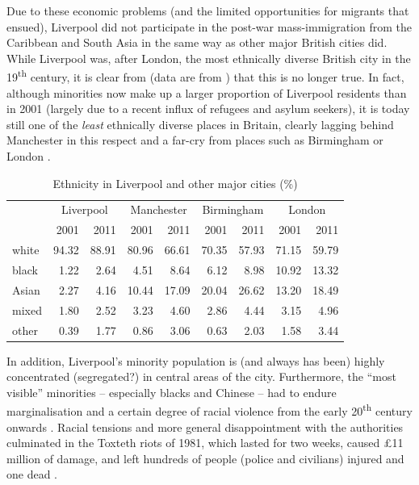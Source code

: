 Due to these economic problems (and the limited opportunities for migrants that ensued), Liverpool did not participate in the post-war mass-immigration from the Caribbean and South Asia in the same way as other major British cities did.
While Liverpool was, after London, the most ethnically diverse British city in the 19\textsuperscript{th} century, it is clear from  (data are from \citealt{nomis}) that this is no longer true.
In fact, although minorities now make up a larger proportion of Liverpool residents than in 2001 (largely due to a recent influx of refugees and asylum seekers), it is today still one of the \emph{least} ethnically diverse places in Britain, clearly lagging behind Manchester in this respect and a far-cry from places such as Birmingham or London \citep[cf.][187]{pooley2006}.

	\begin{table}[h]
		\centering
		\caption{Ethnicity in Liverpool and other major cities (\%)}
		\begin{tabular}{lrrrrrrrr}
			\toprule
	 		& \multicolumn{2}{c}{Liverpool} & \multicolumn{2}{c}{Manchester} & \multicolumn{2}{c}{Birmingham} & \multicolumn{2}{c}{London} \\
			 & 2001 & 2011 & 2001 & 2011 & 2001 & 2011 & 2001 & 2011 \\
			 \midrule
			 white & 94.32 & 88.91 & 80.96 & 66.61 & 70.35 & 57.93 & 71.15 & 59.79 \\
			 black & 1.22 & 2.64 & 4.51 & 8.64 & 6.12 & 8.98 & 10.92 & 13.32 \\
	 		 Asian & 2.27 & 4.16 & 10.44 & 17.09 & 20.04 & 26.62 & 13.20 & 18.49 \\
	 		 mixed & 1.80 & 2.52 & 3.23 & 4.60 & 2.86 & 4.44 & 3.15 & 4.96 \\
	 		 other & 0.39 & 1.77 & 0.86 & 3.06 & 0.63 & 2.03 & 1.58 & 3.44 \\
	 		 \bottomrule
		\end{tabular}
		\label{tab.ethnicity}
	\end{table}

In addition, Liverpool's minority population is (and always has been) highly concentrated (segregated?) in central areas of the city.
Furthermore, the ``most visible'' minorities -- especially blacks and Chinese -- had to endure marginalisation and a certain degree of racial violence from the early 20\textsuperscript{th} century onwards \citep[cf.][189--191]{pooley2006}.
Racial tensions and more general disappointment with the authorities culminated in the Toxteth riots of 1981, which lasted for two weeks, caused \pounds11 million of damage, and left hundreds of people (police and civilians) injured and one dead \citep[cf][440--444]{murden2006}.

